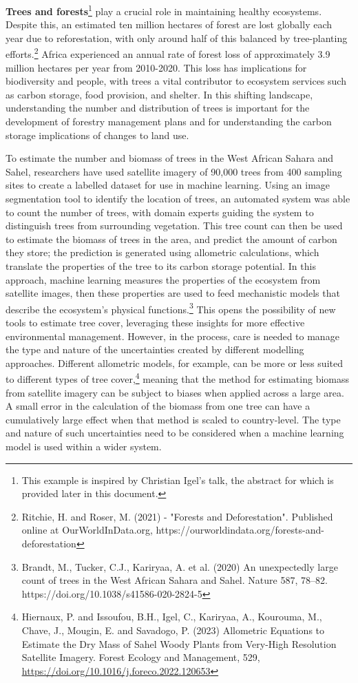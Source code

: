{\textbf{Trees and forests}\footnote{This example is inspired by
  Christian Igel's talk, the abstract for which is provided later in
  this document.} play a crucial role in maintaining healthy ecosystems.
Despite this, an estimated ten million hectares of forest are lost
globally each year due to reforestation, with only around half of this
balanced by tree-planting efforts.\footnote{Ritchie, H. and Roser, M.
  (2021) - "Forests and Deforestation". Published online at
  OurWorldInData.org,
  https://ourworldindata.org/forests-and-deforestation} Africa
experienced an annual rate of forest loss of approximately 3.9 million
hectares per year from 2010-2020. This loss has implications for
biodiversity and people, with trees a vital contributor to ecosystem
services such as carbon storage, food provision, and shelter. In this
shifting landscape, understanding the number and distribution of trees
is important for the development of forestry management plans and for
understanding the carbon storage implications of changes to land use.

To estimate the number and biomass of trees in the West African Sahara
and Sahel, researchers have used satellite imagery of 90,000 trees from
400 sampling sites to create a labelled dataset for use in machine
learning. Using an image segmentation tool to identify the location of
trees, an automated system was able to count the number of trees, with
domain experts guiding the system to distinguish trees from surrounding
vegetation. This tree count can then be used to estimate the biomass of
trees in the area, and predict the amount of carbon they store; the
prediction is generated using allometric calculations, which translate
the properties of the tree to its carbon storage potential. In this
approach, machine learning measures the properties of the ecosystem from
satellite images, then these properties are used to feed mechanistic
models that describe the ecosystem's physical functions.\footnote{Brandt,
  M., Tucker, C.J., Kariryaa, A. et al. (2020) An unexpectedly large
  count of trees in the West African Sahara and Sahel. Nature 587,
  78--82. https://doi.org/10.1038/s41586-020-2824-5} This opens the
possibility of new tools to estimate tree cover, leveraging these
insights for more effective environmental management. However, in the
process, care is needed to manage the type and nature of the
uncertainties created by different modelling approaches. Different
allometric models, for example, can be more or less suited to different
types of tree cover,\footnote{Hiernaux, P. and Issoufou, B.H., Igel, C.,
  Kariryaa, A., Kourouma, M., Chave, J., Mougin, E. and Savadogo, P.
  (2023) Allometric Equations to Estimate the Dry Mass of Sahel Woody
  Plants from Very-High Resolution Satellite Imagery. Forest Ecology and
  Management, 529,
  \href{https://doi.org/10.1016/j.foreco.2022.120653}{\uline{https://doi.org/10.1016/j.foreco.2022.120653}}}
meaning that the method for estimating biomass from satellite imagery
can be subject to biases when applied across a large area. A small error
in the calculation of the biomass from one tree can have a cumulatively
large effect when that method is scaled to country-level. The type and
nature of such uncertainties need to be considered when a machine
learning model is used within a wider system.

}
